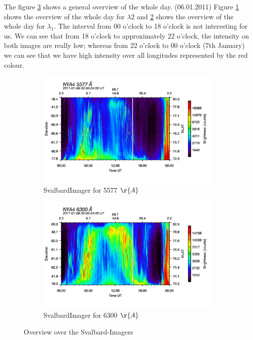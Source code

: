 \documentclass[10pt,a4paper]{article}
\begin{document}
The figure \ref{SBI_all_overview} shows a general overview of the whole day. (06.01.2011) Figure \ref{SBI_5_overview} shows the overview of the whole day for $\lambda2$ and \ref{SBI_6_overview} shows the overview of the whole day for $\lambda_1$. The interval from 00 o'clock to 18 o'clock is not interesting for us. We can see that from 18 o'clock to approximately 22 o'clock, the intensity on both images are really low; whereas from 22 o'clock to 00 o'clock (7th January) we can see that we have high intensity over all longitudes represented by the red colour.


\begin{figure}[h]
\centering
\begin{subfigure}{0.45\textwidth}
\centering
	\includegraphics[width=\textwidth]{SvalbardImager5577A.png}
	\caption{ SvalbardImager for 5577 $\r{A}$ \label{SBI_5_overview}}
\end{subfigure}
\begin{subfigure}{0.45\textwidth}
\centering
	\includegraphics[width=\textwidth]{SvalbardImager6300A.png}
	\caption{ SvalbardImager for 6300 $\r{A}$\label{SBI_6_overview}}
\end{subfigure}
\caption{Overview over the Svalbard-Imagers}
\label{SBI_all_overview}
\end{figure}
\end{document}
